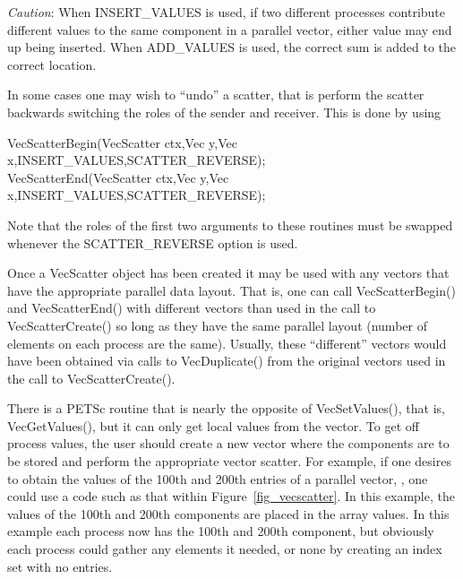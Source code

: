 {\em Caution}: When INSERT_VALUES is used, if two different
processes contribute different values to the same component in a
parallel vector, either value may end up being inserted. When 
ADD_VALUES is used, the correct sum is added to the correct
location.

In some cases one may wish to ``undo'' a scatter, that is perform the 
scatter backwards switching the roles of the sender and receiver. This is 
done by using 
\begin{tabbing}
  VecScatterBegin(VecScatter ctx,Vec y,Vec x,INSERT_VALUES,SCATTER_REVERSE);\\
  VecScatterEnd(VecScatter ctx,Vec y,Vec x,INSERT_VALUES,SCATTER_REVERSE);
\end{tabbing} 
Note that the roles of the first 
two arguments to these routines must be swapped whenever the SCATTER_REVERSE
option is used.

Once a VecScatter object has been created it may be used with any vectors
that have the appropriate parallel data layout. That is, one can call 
VecScatterBegin() and VecScatterEnd() with different vectors than 
used in the call to VecScatterCreate() so long as they have the same 
parallel layout (number of elements on each process are the same). Usually,
these ``different'' vectors would have been obtained via calls to 
VecDuplicate() from the original vectors used in the call to 
VecScatterCreate().

There is a PETSc routine that is nearly the opposite of VecSetValues(), that is, VecGetValues(), but it can only get
local values from the vector. 
To get off process values, the user should create a new vector where
the components are to be stored and perform the appropriate vector 
scatter. For example, if one desires to obtain the values of the 
100th and 200th entries of a parallel vector, , one could use 
a code such as that within Figure~\ref{fig_vecscatter}.
In this example, the values of the 100th and 200th components are
placed in the array 
values. In this example each process now has the 100th and 
200th component, but obviously each process could gather any 
elements it needed, or none by creating an index set with no entries.

